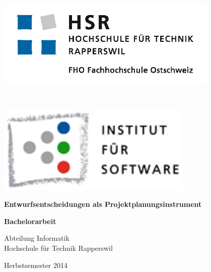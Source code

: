 \begin{titlepage}
	\thispagestyle{empty}

	\begin{minipage}{0.5\textwidth}
		\begin{flushleft} \large
			\includegraphics[width=0.8\textwidth]{media/img/logoHSR.png}
		\end{flushleft}
	\end{minipage}
	~
	\begin{minipage}{0.5\textwidth}
		\begin{flushright} \large
			\includegraphics[width=0.7\textwidth]{media/img/ifsLogo.png}
		\end{flushright}
	\end{minipage}

	\vspace{80pt}

	\begin{center}
		{ \Huge \bfseries Entwurfsentscheidungen als Projektplanungsinstrument}\\
	\end{center}
	\vspace{20pt}
	\begin{center}
		{ \Huge \bfseries Bachelorarbeit}
	\end{center}
	
	\vspace{40pt}
	
	\begin{center}
		{ \huge Abteilung Informatik\\Hochschule für Technik Rapperswil}
	\end{center}
	\vspace{10pt}
	\begin{center}
		{ \huge Herbstsemester 2014}
	\end{center}
	

\end{titlepage}
